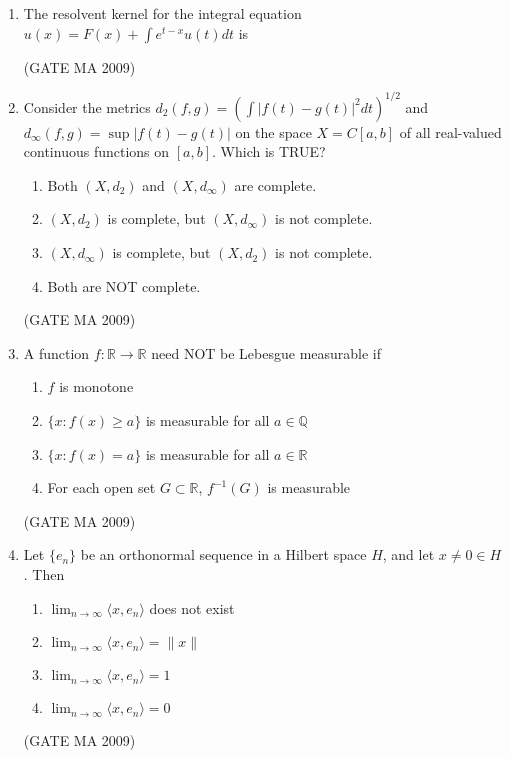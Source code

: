 \documentclass[journal,12pt,onecolumn]{IEEEtran}
\theoremstyle{remark}
\begin{document}
\begin{enumerate}
\item The resolvent kernel for the integral equation $u(x) = F(x) + \int e^{t-x} u(t) dt$ is
\begin{enumerate}
\end{enumerate}
\hfill (GATE MA 2009)

\item Consider the metrics $d_2(f,g) = \left( \int |f(t)-g(t)|^2 dt \right)^{1/2}$ and $d_\infty(f,g) = \sup |f(t)-g(t)|$ on the space $X = C[a,b]$ of all real-valued continuous functions on $[a,b]$. Which is TRUE?
\begin{enumerate}
    \item Both $(X, d_2)$ and $(X, d_\infty)$ are complete.
    \item $(X, d_2)$ is complete, but $(X, d_\infty)$ is not complete.
    \item $(X, d_\infty)$ is complete, but $(X, d_2)$ is not complete.
    \item Both are NOT complete.
\end{enumerate}
\hfill (GATE MA 2009)

\item A function $f:\mathbb{R}\to\mathbb{R}$ need NOT be Lebesgue measurable if
\begin{enumerate}
    \item $f$ is monotone
    \item $\{x : f(x)\geq a\}$ is measurable for all $a\in\mathbb{Q}$
    \item $\{x : f(x)=a\}$ is measurable for all $a\in\mathbb{R}$
    \item For each open set $G \subset \mathbb{R}$, $f^{-1}(G)$ is measurable
\end{enumerate}
\hfill (GATE MA 2009)

\item Let $\{e_n\}$ be an orthonormal sequence in a Hilbert space $H$, and let $x \neq 0 \in H$. Then
\begin{enumerate}
    \item $\lim_{n\to\infty}\langle x, e_n\rangle$ does not exist
    \item $\lim_{n\to\infty}\langle x, e_n\rangle = \|x\|$
    \item $\lim_{n\to\infty}\langle x, e_n\rangle = 1$
    \item $\lim_{n\to\infty}\langle x, e_n\rangle = 0$
\end{enumerate}
\hfill (GATE MA 2009)


\end{enumerate}
\end{document}
